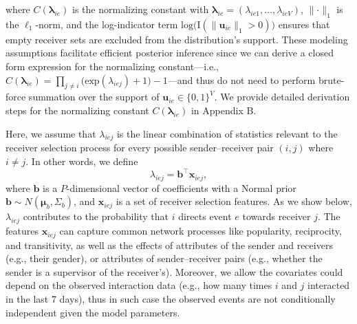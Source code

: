 \documentclass[ba]{imsart}
\numberwithin{equation}{section}
\theoremstyle{plain}
\begin{document}
	where $C(\boldsymbol{\lambda}_{ie})$ is the normalizing constant with $\boldsymbol{\lambda}_{ie}= (\lambda_{ie1},
	\ldots, \lambda_{ieV})$, $\lVert \cdot \rVert_1$ is the $\ell_1$-norm, and the log-indicator term $\mbox{log}\big(\text{I}( \lVert \boldsymbol{u}_{ie}\rVert_1 > 0 )\big)$ ensures that empty receiver sets are excluded from the distribution's support. These modeling assumptions facilitate efficient posterior inference since we can derive a closed form expression for the normalizing constant---i.e., $C(\boldsymbol{\lambda}_{ie})= \prod_{j\neq i} \big(\mbox{exp}(\lambda_{iej}) + 1\big)-1$---and thus do not need to perform brute-force summation over the support of $\boldsymbol{u}_{ie} \in \{0,1\}^V$. We provide detailed derivation steps for the normalizing constant $C(\boldsymbol{\lambda}_{ie})$ in Appendix B. 
	
	Here, we assume that $\lambda_{iej}$ is the linear combination of statistics relevant to the receiver selection process for every possible sender--receiver pair $(i,j)$ where $i \!\neq\! j$. In other words, we define
	\begin{equation}
	\lambda_{iej} = {\boldsymbol{b}}^{\top}\boldsymbol{x}_{iej},
	\end{equation}
	where $\boldsymbol{b}$ is a $P$-dimensional vector of coefficients with a Normal prior $\boldsymbol{b} \sim N(\boldsymbol{\mu}_b, \Sigma_b)$, and $\boldsymbol{x}_{iej}$ is a set of receiver selection features. As we show below, $\lambda_{iej}$ contributes to the probability that $i$ directs event $e$ towards receiver $j$. The features $\boldsymbol{x}_{iej}$ can capture common network processes like popularity, reciprocity, and transitivity, as well as the effects of attributes of the sender and receivers (e.g., their gender), or attributes of sender--receiver pairs (e.g., whether the sender is a supervisor of the receiver's). Moreover, we allow the covariates could depend on the observed interaction data (e.g., how many times $i$ and $j$ interacted in the last 7 days), thus in such case the observed events are not conditionally independent given the model parameters. ~
\end{document}
